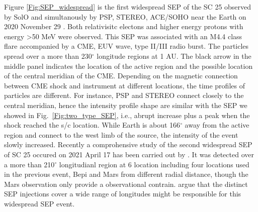 Figure \ref{Fig:SEP_widespread} is the first widespread \ac{SEP} of the \ac{SC} 25 observed by \ac{SolO} and simultanously by \ac{PSP}, \ac{STEREO}, \ac{ACE}/\ac{SOHO} near the Earth on 2020 November 29 \citet{Kolhoff2021AA, Kouloumvakos2022AA, Palmerio2022SpWea}. Both relativisitc electons and higher energy protons with energy >50 MeV were observed. This SEP was associated with an M4.4 class flare accompanied by a \ac{CME}, \ac{EUV} wave, type II/III radio burst. The particles spread over a more than 230$^\circ$ longitude regions at 1 AU. The black arrow in the middle panel indicates the location of the active region and the possible location of the central meridian of the \ac{CME}.  Depending on the magnetic connection between \ac{CME} shock and instrument at different locations, the time profiles of particles are different. For instance, \ac{PSP} and \ac{STEREO} connect closely to the central meridian, hence the intensity profile shape are similar with the \ac{SEP} we showed in Fig.~\ref{Fig:two_type_SEP}, i.e., abrupt increase plus a peak when the shock reached the s/c location. While Earth is about 166$^\circ$ away from the active region and connect to the west limb of the source, the intensity of the event slowly increased.
Recently a comprohensive study of the second widespread \ac{SEP} of \ac{SC} 25 occured on 2021 April 17 has been carried out by \citep{dresing202317}. It was detected over a more than 210$^\circ$ longitudianl region at 6 location including four locations used in the previous event, \ac{Bepi} and Mars from different radial distance, though the Mars observation only provide a observational contrain. \citep{dresing202317} argue that the distinct SEP injections cover a wide range of longitudes might be responsible for this widespread SEP event.

